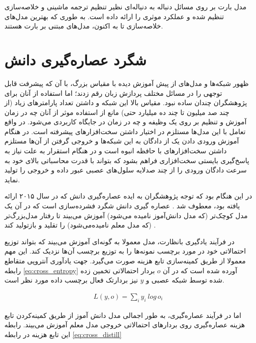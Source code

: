 مدل بارت بر روی مسائل دنباله به دنیاله‌ای نظیر تنظیم ترجمه ماشینی و خلاصه‌سازی تنظیم شده و عملکرد موثری را ارائه داده است. به طوری که بهترین مدل‌های خلاصه‌سازی تا به اکنون، مدل‌های مبتنی بر بارت هستند. 

\section{شگرد عصاره‌گیری دانش 
}
ظهور شبکه‌ها و مدل‌های از پیش آموزش دیده با مقیاس بزرگ، با آن که پیشرفت قابل توجهی را در مسائل مختلف پردازش زبان رقم زدند؛ اما استفاده از آنان برای پژوهشگران چندان ساده نبود.
مقیاس بالا این شبکه و داشتن تعداد پارامتر‌های زیاد (از چند صد میلیون تا چند ده میلیارد حتی) مانع از استفاده موثر از آنان چه در زمان آموزش و تنظیم بر روی یک وظیفه و چه در زمان 
در جایگاه کاربردی می‌شود. در واقع تعامل با این مدل‌ها مستلزم در اختیار داشتن سخت‌افزار‌های پیشرفته است. در هنگام آموزش ورودی دادن یک
از دادگان به این شبکه‌ها و خروجی گرفتن از آن‌ها مستلزم داشتن سخت‌افزار‌های با حافظه انبوه است و در هنگام استقرار به علت نیاز به پاسخ‌گیری 
بایستی سخت‌افزاری فراهم بشود که بتواند با قدرت محاسباتی بالای خود به سرعت دادگان ورودی را از چند صدلایه سلول‌های عصبی عبور داده و خروجی را تولید نماید. 

در این هنگام بود که توجه پژوهشگران به ایده عصاره‌گیری دانش
که در سال ۲۰۱۵ ارائه یافته بود، معطوف شد
\cite{hinton2015distilling}.
عصاره گیری دانش شگرد فشرده‌سازی است که در آن یک مدل کوچک‌تر (که مدل دانش‌آموز نامیده می‌شود) آموزش می‌بیند تا رفتار مدل‌بزرگ‌تر (که مدل معلم نامیده‌می‌شود) را تقلید و بازتولید کند
\cite{hinton2015distilling}.

در فرآیند یادگیری بانظارت، مدل معمولا به گونه‌ای آموزش می‌بیند که بتواند توزیع احتمالاتی خود در مورد برچسب نمونه‌ها را به توزیع 
برچسب‌ آن‌ها نزدیک کند. این مهم معمولا از طریق کمینه‌سازی تابع هزینه
صورت می‌گیرد. جهت یادآوری آنتروپی متقاطع رابطه
\ref{eq:cross_entropy}
 آورده شده است که در آن $o$ بردار احتمالاتی تخمین زده شده توسط شبکه عصبی و $y$ نیز بردارتک فعال برچسب داده مورد نظر است.


\begin{align} \label{eq:cross_entropy}
L(y, o) = \sum_{i}^{} y_i\:log\,o_i
\end{align}

اما در فرآیند عصاره‌گیری، به طور اجمالی مدل دانش آموز از طریق کمینه‌کردن تابع هزینه عصاره‌گیری روی بردار‌های احتمالاتی خروجی مدل معلم آموزش می‌بیند. رابطه این تابع هزینه در رابطه
\ref{eq:cross_distill}

